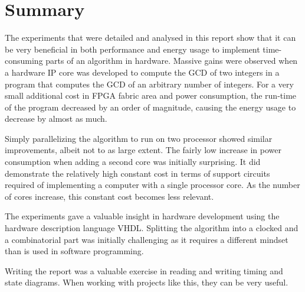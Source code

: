 \documentclass[11pt]{article}
\begin{document}
\section{Summary\label{sec:summary}}
The experiments that were detailed and analysed in this report show that it can be very beneficial in both performance and energy usage to implement time-consuming parts of an algorithm in hardware. Massive gains were observed when a hardware IP core was developed to compute the GCD of two integers in a program that computes the GCD of an arbitrary number of integers. For a very small additional cost in FPGA fabric area and power consumption, the run-time of the program decreased by an order of magnitude, causing the energy usage to decrease by almost as much.

Simply parallelizing the algorithm to run on two processor showed similar improvements, albeit not to as large extent. The fairly low increase in power consumption when adding a second core was initially surprising. It did demonstrate the relatively high constant cost in terms of support circuits required of implementing a computer with a single processor core. As the number of cores increase, this constant cost becomes less relevant.

The experiments gave a valuable insight in hardware development using the hardware description language VHDL. Splitting the algorithm into a clocked and a combinatorial part was initially challenging as it requires a different mindset than is used in software programming.

Writing the report was a valuable exercise in reading and writing timing and state diagrams. When working with projects like this, they can be very useful.

\printbibliography
\end{document}
